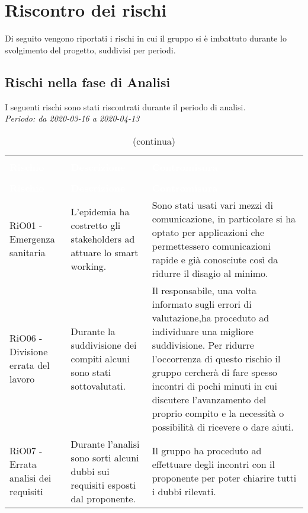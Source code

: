 \section{Riscontro dei rischi}
Di seguito vengono riportati i rischi in cui il gruppo si è imbattuto durante lo svolgimento del progetto, suddivisi per periodi.

\subsection{Rischi nella fase di Analisi}
I seguenti rischi sono stati riscontrati durante il periodo di analisi. \\
\textit{Periodo: da 2020-03-16 a 2020-04-13}

\begin{longtable}{C{3cm} L{5cm} L{7cm}}
\caption{Attualizzazione dei rischi - Analisi} \\
\textcolor{white}{\textbf{Rischio}} &
\textcolor{white}{\textbf{Descrizione}} &
\textcolor{white}{\textbf{Contromisura}}\\
		\endfirsthead
		\caption[]{(continua)} \\
\textcolor{white}{\textbf{Rischio}} &
\textcolor{white}{\textbf{Descrizione}} &
\textcolor{white}{\textbf{Contromisura}}\\
		\endhead

RiO01 - Emergenza sanitaria	& L'epidemia ha costretto gli stakeholders ad attuare lo smart working. & Sono stati usati vari mezzi di comunicazione, in particolare si ha optato per applicazioni che permettessero comunicazioni rapide e già conosciute così da ridurre il disagio al minimo.
\\
RiO06 - Divisione errata del lavoro & Durante la suddivisione dei compiti alcuni sono stati sottovalutati. & Il responsabile, una volta informato sugli errori di valutazione,ha proceduto ad individuare una migliore suddivisione. Per ridurre l'occorrenza di questo rischio il gruppo cercherà di fare spesso incontri di pochi minuti in cui discutere l'avanzamento del proprio compito e la necessità o possibilità di ricevere o dare aiuti.
\\
RiO07 - Errata analisi dei requisiti & Durante l'analisi sono sorti alcuni dubbi sui requisiti esposti dal proponente. & Il gruppo ha proceduto ad effettuare degli incontri con il proponente per poter chiarire tutti i dubbi rilevati.
\\

\end{longtable}


